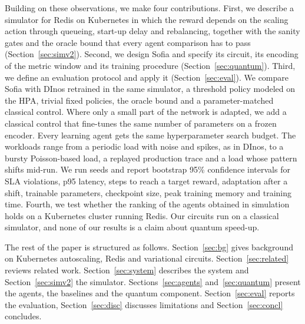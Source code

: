 Building on these observations, we make four contributions. First, we describe a simulator for Redis on Kubernetes in which the reward
depends on the scaling action through queueing, start-up delay and rebalancing, together with the sanity gates and
the oracle bound that every agent comparison has to pass (Section~\ref{sec:simv2}). Second, we design Sofia and
specify its circuit, its encoding of the metric window and its training procedure (Section~\ref{sec:quantum}).
Third, we define an evaluation protocol and apply it (Section~\ref{sec:eval}). We compare Sofia with DInos
retrained in the same simulator, a threshold policy modeled on the HPA, trivial fixed policies, the oracle bound and
a parameter-matched classical control. Where only a small part of the network is adapted, we add a classical
control that fine-tunes the same number of parameters on a frozen encoder. Every learning agent gets the same
hyperparameter search budget. The workloads range from a periodic load with noise and spikes, as in DInos, to a
bursty Poisson-based load, a replayed production trace and a load whose pattern shifts mid-run. We run \resNumSeeds{} seeds and report bootstrap 95\% confidence intervals for SLA violations,
p95 latency, steps to reach a target reward, adaptation after a shift, trainable parameters, checkpoint size,
peak training memory and training time. Fourth, we test whether the ranking of the agents obtained in simulation
holds on a Kubernetes cluster running Redis. Our circuits run on a classical
simulator, and none of our results
is a claim about quantum speed-up.

The rest of the paper is structured as follows. Section~\ref{sec:bg} gives background on Kubernetes autoscaling, Redis and variational circuits.
Section~\ref{sec:related} reviews related work. Section~\ref{sec:system} describes the system and
Section~\ref{sec:simv2} the simulator. Sections~\ref{sec:agents} and~\ref{sec:quantum} present the agents,
the baselines and the quantum component. Section~\ref{sec:eval} reports the evaluation,
Section~\ref{sec:disc} discusses limitations and Section~\ref{sec:concl} concludes.
